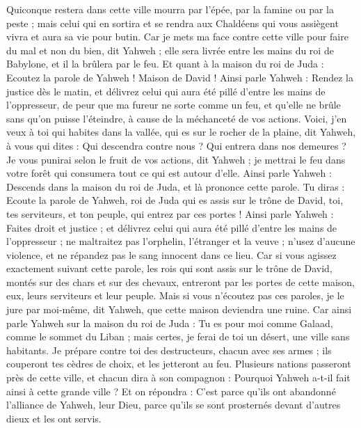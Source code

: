 \begin{multicols}{2}
Quiconque restera dans cette ville mourra par l'épée, par la famine ou par la peste ; mais celui qui en sortira et se rendra aux Chaldéens qui vous assiègent vivra et aura sa vie pour butin.
Car je mets ma face contre cette ville pour faire du mal et non du bien, dit Yahweh ; elle sera livrée entre les mains du roi de Babylone, et il la brûlera par le feu.
Et quant à la maison du roi de Juda : Ecoutez la parole de Yahweh !
Maison de David ! Ainsi parle Yahweh : Rendez la justice dès le matin, et délivrez celui qui aura été pillé d'entre les mains de l’oppresseur, de peur que ma fureur ne sorte comme un feu, et qu'elle ne brûle sans qu’on puisse l’éteindre, à cause de la méchanceté de vos actions.
Voici, j'en veux à toi qui habites dans la vallée, qui es sur le rocher de la plaine, dit Yahweh, à vous qui dites : Qui descendra contre nous ? Qui entrera dans nos demeures ?
Je vous punirai selon le fruit de vos actions, dit Yahweh ; je mettrai le feu dans votre forêt qui consumera tout ce qui est autour d'elle.
\VerseOne{}Ainsi parle Yahweh : Descends dans la maison du roi de Juda, et là prononce cette parole.
Tu diras : Ecoute la parole de Yahweh, roi de Juda qui es assis sur le trône de David, toi, tes serviteurs, et ton peuple, qui entrez par ces portes !
Ainsi parle Yahweh : Faites droit et justice ; et délivrez celui qui aura été pillé d'entre les mains de l’oppresseur ; ne maltraitez pas l'orphelin, l'étranger et la veuve ; n'usez d'aucune violence, et ne répandez pas le sang innocent dans ce lieu.
Car si vous agissez exactement suivant cette parole, les rois qui sont assis sur le trône de David, montés sur des chars et sur des chevaux, entreront par les portes de cette maison, eux, leurs serviteurs et leur peuple.
Mais si vous n'écoutez pas ces paroles, je le jure par moi-même, dit Yahweh, que cette maison deviendra une ruine.
Car ainsi parle Yahweh sur la maison du roi de Juda : Tu es pour moi comme Galaad, comme le sommet du Liban ; mais certes, je ferai de toi un désert, une ville sans habitants.
Je prépare contre toi des destructeurs, chacun avec ses armes ; ils couperont tes cèdres de choix, et les jetteront au feu.
Plusieurs nations passeront près de cette ville, et chacun dira à son compagnon : Pourquoi Yahweh a-t-il fait ainsi à cette grande ville ?
Et on répondra : C'est parce qu'ils ont abandonné l'alliance de Yahweh, leur Dieu, parce qu'ils se sont prosternés devant d'autres dieux et les ont servis.

\end{multicols}
